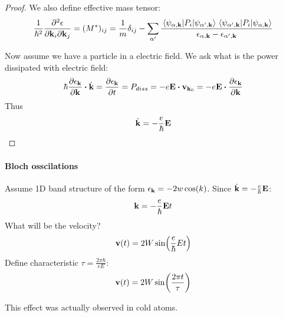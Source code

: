 \begin{prop}
\begin{proof}
	
	
	We also define effective mass tensor:
	\begin{align}
	\frac{1}{\hbar^2}  \pdv{\epsilon}{\vb{k}_i }{\vb{k}_j} = (M^*)_{ij} = 
	\frac{1}{m} \delta_{ij}  - 
	\sum_{\alpha'} \frac{\mel{\psi_{\alpha, \vb{k}}}{P_i}{\psi_{\alpha', \vb{k}}}\mel{\psi_{\alpha', \vb{k}}}{P_i}{\psi_{\alpha, \vb{k}}}}{\epsilon_{\alpha, \vb{k}}-\epsilon_{\alpha', \vb{k}}}
	\end{align}
	
	Now assume we have a particle in a electric field. We ask what is the power dissipated with electric field:
	\begin{align}
	\hbar \pdv{\epsilon_{\vb{k}}}{\vb{k}}  \vdot \dot{\vb{k}} =\pdv{\epsilon_{\vb{k}}}{t} =P_{diss} = - e \vb{E} \vdot \vb{v}_{\vb{k}_0} = -e \vb{E} \vdot \pdv{\epsilon_{\vb{k}}}{\vb{k}}
	\end{align}
	Thus
	\begin{align}
	 \dot{\vb{k}} = -\frac{e}{\hbar} \vb{E} 
	\end{align}
\end{proof}
\end{prop}

\paragraph{Bloch osscilations}
Assume 1D band structure of the form $\epsilon_{\vb{k}} = - 2w\cos(k)$. Since $\dot{\vb{k}} = -\frac{e}{\hbar} \vb{E} $:
\begin{align}
\vb{k} = -\frac{e}{\hbar}\vb{E} t
\end{align}
What will be the velocity?
\begin{align}
\vb{v}(t) = 2W \sin(\frac{e}{\hbar}E t)
\end{align}
Define characteristic $ \tau = \frac{2\pi \hbar}{eE} $:
\begin{align}
\vb{v}(t) = 2W \sin(\frac{2\pi t}{\tau})
\end{align}

This effect was actually observed in cold atoms.